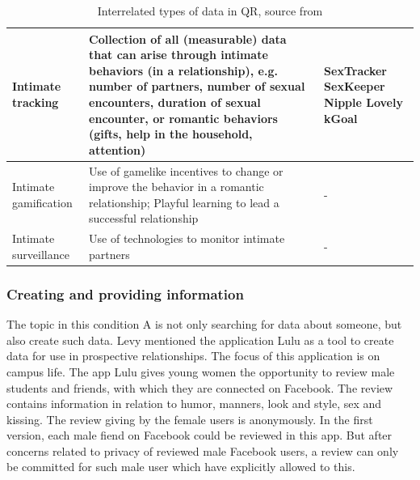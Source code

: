 \begin{table}
	\caption{Interrelated types of data in \acl{QR}, source from \cite{doi:10.1080/15265161.2017.1409823}}
	\label{tab:typ_of_QR}
	\scriptsize
	\begin{center}
		\begin{tabular}{|p{4cm}|p{11cm}|p{2cm}|}
			\hline
			Intimate tracking &  Collection of all (measurable) data that can arise through intimate behaviors (in a relationship), e.g. number of partners, number of sexual encounters, duration of sexual encounter, or romantic behaviors (gifts, help in the household, attention) & SexTracker \newline SexKeeper \newline Nipple \newline Lovely \newline kGoal \\
			\hline
			Intimate gamification & Use of gamelike incentives to change or improve the behavior in a romantic relationship; Playful learning to lead a successful relationship & - \\
			\hline
			Intimate surveillance & Use of technologies to monitor intimate partners & - \\
			\hline
		\end{tabular}
	\end{center}
\end{table}
\subsubsection{Creating and providing information}
The topic in this condition A is not only searching for data about someone, but also create such data. Levy \cite{levy2014intimate} mentioned the application Lulu as a tool to create data for use in prospective relationships. The focus of this application is on campus life. The app Lulu gives young women the opportunity to review male students and friends, with which they are connected on Facebook. The review contains information in relation to humor, manners, look and style, sex and kissing. The review giving by the female users is anonymously. In the first version, each male fiend on Facebook could be reviewed in this app. But after concerns related to privacy of reviewed male Facebook users, a review can only be committed for such male user which have explicitly allowed to this.

